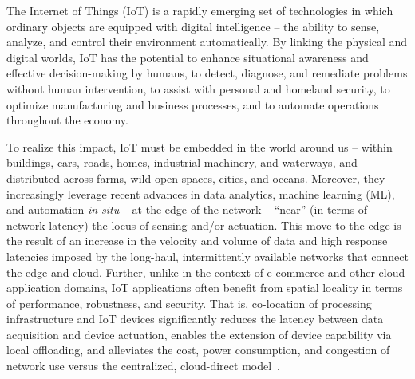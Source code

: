 The Internet of Things (IoT) is a rapidly emerging set of technologies in which ordinary objects are equipped with digital intelligence -- the ability to sense, analyze, and control their environment automatically. By linking the physical and digital worlds, IoT has the potential to enhance situational awareness and effective decision-making by humans, to detect, diagnose, and remediate problems without human intervention, to assist with personal and homeland security, to optimize manufacturing and business processes, and to automate operations throughout the economy.

To realize this impact, IoT must be embedded in the world around us -- within buildings, cars, roads, homes, industrial machinery, and waterways, and distributed across farms, wild open spaces, cities, and oceans. Moreover, they increasingly leverage recent advances in data analytics, machine learning (ML), and automation \textit{in-situ} -- at the edge of the network -- ``near'' (in terms of network latency) the locus of sensing and/or actuation. This move to the edge is the result of an increase in the velocity and volume of data and high response latencies imposed by the long-haul, intermittently available networks that connect the edge and cloud. Further, unlike in the context of e-commerce and other cloud application domains, IoT applications often benefit from spatial locality in terms of performance, robustness, and security. That is, co-location of processing infrastructure and IoT devices significantly reduces the latency between data acquisition and device actuation, enables the extension of device capability via local offloading, and alleviates the cost, power consumption, and congestion of network use versus the centralized, cloud-direct model~\cite{edge}.

